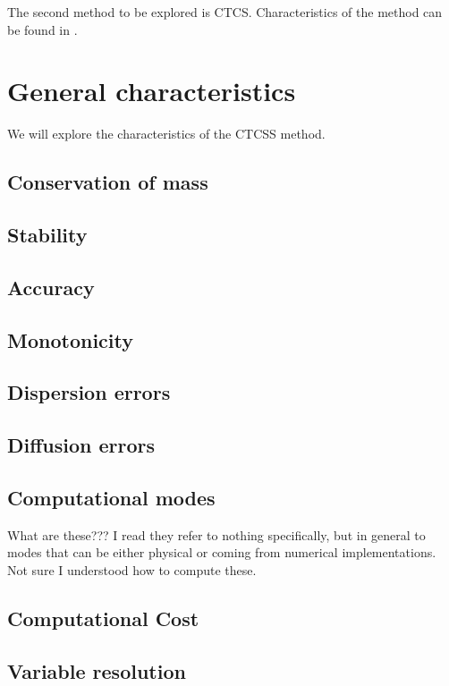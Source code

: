 

The second method to be explored is CTCS. Characteristics of the method can be found in \cite{mpebook}.


\section{General characteristics}
We will explore the characteristics of the CTCSS method.

\subsection{Conservation of mass} \label{conservationctcs}

\subsection{Stability} \label{stabilityctcs}


\subsection{Accuracy}

\subsection{Monotonicity}

\subsection{Dispersion errors}

\subsection{Diffusion errors}

\subsection{Computational modes}
What are these??? I read they refer to nothing specifically, but in general to modes that can be either physical or coming from numerical implementations. Not sure I understood how to compute these.

\subsection{Computational Cost}

\subsection{Variable resolution}

